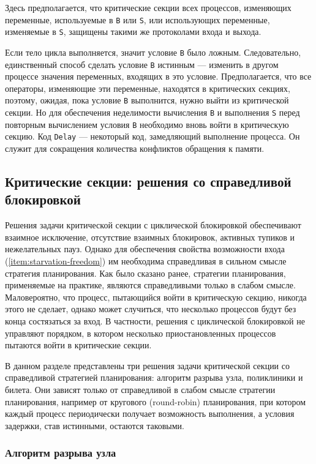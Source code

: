 Здесь предполагается, что критические секции всех процессов, изменяющих
переменные, используемые в \texttt{B} или \texttt{S}, или использующих
переменные, изменяемые в \texttt{S}, защищены такими же протоколами входа и
выхода.

Если тело цикла выполняется, значит условие \texttt{B} было
ложным. Следовательно, единственный способ сделать условие \texttt{B} истинным
--- изменить в другом процессе значения переменных, входящих в это
условие. Предполагается, что все операторы, изменяющие эти переменные, находятся
в критических секциях, поэтому, ожидая, пока условие \texttt{B} выполнится,
нужно выйти из критической секции. Но для обеспечения неделимости вычисления
\texttt{B} и выполнения \texttt{S} перед повторным вычислением условия
\texttt{B} необходимо вновь войти в критическую секцию. Код \texttt{Delay} ---
некоторый код, замедляющий выполнение процесса. Он служит для сокращения
количества конфликтов обращения к памяти.



\subsection{Критические секции: решения со справедливой блокировкой}

Решения задачи критической секции с циклической блокировкой обеспечивают
взаимное исключение, отсутствие взаимных блокировок, активных тупиков и
нежелательных пауз. Однако для обеспечения свойства возможности входа
(\ref{item:starvation-freedom}) им необходима справедливая в сильном смысле
стратегия планирования. Как было сказано ранее, стратегии планирования,
применяемые на практике, являются справедливыми только в слабом
смысле. Маловероятно, что процесс, пытающийся войти в критическую секцию,
никогда этого не сделает, однако может случиться, что несколько процессов будут
без конца состязаться за вход. В частности, решения с циклической блокировкой не
управляют порядком, в котором несколько приостановленных процессов пытаются
войти в критические секции.

В данном разделе представлены три решения задачи критической секции со
справедливой стратегией планирования: алгоритм разрыва узла, поликлиники и
билета. Они зависят только от справедливой в слабом смысле стратегии
планирования, например от кругового (round-robin) планирования, при котором
каждый процесс периодически получает возможность выполнения, а условия задержки,
став истинными, остаются таковыми.


\subsubsection{Алгоритм разрыва узла}

